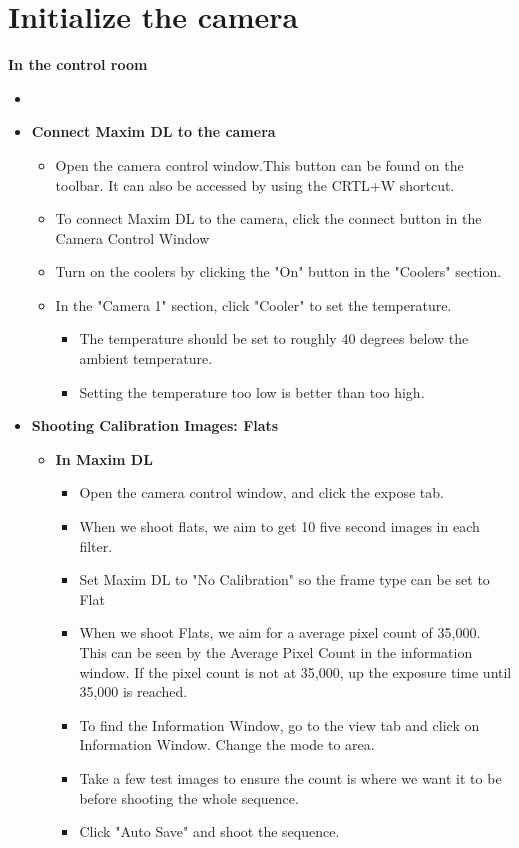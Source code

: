 \documentclass[letterpaper, 12pt]{report}
\begin{document}
\section{Initialize the camera}
\large \textbf{In the control room}
\begin{itemize}
\item []
\end{itemize}
\begin{itemize}
	\item \textbf{Connect Maxim DL to the camera}
	\begin{itemize}
		\item Open the camera control window.This button can be found on the toolbar. It can also be accessed by using the CRTL+W shortcut.
		\item To connect Maxim DL to the camera, click the connect button in the Camera Control Window
		\item Turn on the coolers by clicking the "On" button in the "Coolers" section.
		\item In the "Camera 1" section, click "Cooler" to set the temperature.
		\begin{itemize}
			\item The temperature should be set to roughly 40 degrees below the ambient temperature. 
			\item Setting the temperature too low is better than too high.
		\end{itemize}
	\end{itemize}
\end{itemize}
	\begin{itemize}
		\item {\large \textbf{Shooting Calibration Images: Flats}}
		\begin{itemize}
			\item \large \textbf{In Maxim DL}
			\begin{itemize}
				\item Open the camera control window, and click the expose tab.
				\item When we shoot flats, we aim to get 10 five second images in each filter.
				\item Set Maxim DL to "No Calibration" so the frame type can be set to Flat
				
				\item When we shoot Flats, we aim for a average pixel count of 35,000. This can be seen by the Average Pixel Count in the information window. If the pixel count is not at 35,000, up the exposure time until 35,000 is reached.
				\item To find the Information Window, go to the view tab and click on Information Window. Change the mode to area.
				\item Take a few test images to ensure the count is where we want it to be before shooting the whole sequence.
				\item Click "Auto Save" and shoot the sequence.
			\end{itemize}
		\end{itemize}
	\end{itemize}
\end{document}
